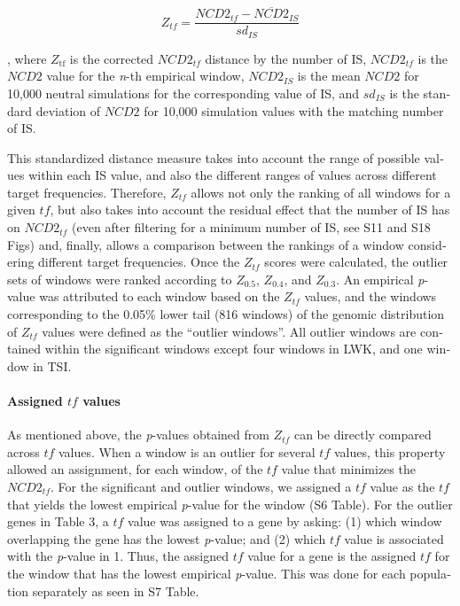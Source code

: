 \begin{refsection}
\begin{otherlanguage}{english}
%
\begin{equation}
Z_{tf}=\frac{NCD2_{tf}-\overline{NCD2}_{IS}}{sd_{IS}}
\end{equation}
%

, where $Z_{\mathrm{tf}}$ is the corrected $NCD2_{tf}$ distance by the number of IS, $NCD2_{tf}$ is the $NCD2$ value for the \emph{n}-th empirical window, $NCD2_{IS}$ is the mean $NCD2$ for 10,000 neutral simulations for the corresponding value of IS, and $sd_{IS}$ is the standard deviation of $NCD2$ for 10,000 simulation values with the matching number of IS.

This standardized distance measure takes into account the range of possible values within each IS value, and also the different ranges of values across different target frequencies. Therefore, $Z_{tf}$ allows not only the ranking of all windows for a given $tf$, but also takes into account the residual effect that the number of IS has on $NCD2_{tf}$ (even after filtering for a minimum number of IS, see S11 and S18 Figs) and, finally, allows a comparison between the rankings of a window considering different target frequencies. Once the $Z_{tf}$ scores were calculated, the outlier sets of windows were ranked according to $Z_{0.5}$, $Z_{0.4}$, and $Z_{0.3}$. An empirical \emph{p}-value was attributed to each window based on the $Z_{tf}$ values, and the windows corresponding to the 0.05\% lower tail (816 windows) of the genomic distribution of $Z_{tf}$ values were defined as the “outlier windows”. All outlier windows are contained within the significant windows except four windows in LWK, and one window in TSI.

%
\paragraph{Assigned $tf$ values}

As mentioned above, the \emph{p}-values obtained from $Z_{tf}$ can be directly compared across $tf$ values. When a window is an outlier for several $tf$ values, this property allowed an assignment, for each window, of the $tf$ value that minimizes the $NCD2_{tf}$. For the significant and outlier windows, we assigned a $tf$ value as the $tf$ that yields the lowest empirical \emph{p}-value for the window (S6 Table). For the outlier genes in Table 3, a $tf$ value was assigned to a gene by asking: (1) which window overlapping the gene has the lowest \emph{p}-value; and (2) which $tf$ value is associated with the \emph{p}-value in 1. Thus, the assigned $tf$ value for a gene is the assigned $tf$ for the window that has the lowest empirical \emph{p}-value. This was done for each population separately as seen in S7 Table.


\end{otherlanguage}
\end{refsection}
